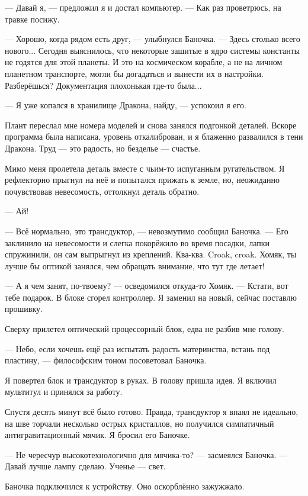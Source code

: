--- Давай я, --- предложил я и достал компьютер.
--- Как раз проветрюсь, на травке посижу.

--- Хорошо, когда рядом есть друг, --- улыбнулся Баночка.
--- Здесь столько всего нового...
Сегодня выяснилось, что некоторые зашитые в ядро системы константы не годятся для этой планеты.
И это на космическом корабле, а не на личном планетном транспорте, могли бы догадаться и вынести их в настройки.
Разберёшься?
Документация плохонькая где-то была...

--- Я уже копался в хранилище Дракона, найду, --- успокоил я его.

Плант переслал мне номера моделей и снова занялся подгонкой деталей.
Вскоре программа была написана, уровень откалиброван, и я блаженно развалился в тени Дракона.
Труд --- это радость, но безделье --- счастье.

Мимо меня пролетела деталь вместе с чьим-то испуганным ругательством.
Я рефлекторно прыгнул на неё и попытался прижать к земле, но, неожиданно почувствовав невесомость, оттолкнул деталь обратно.

--- Ай!

--- Всё нормально, это трансдуктор, --- невозмутимо сообщил Баночка.
--- Его заклинило на невесомости и слегка покорёжило во время посадки, лапки спружинили, он сам выпрыгнул из креплений.
{Ква-ква.}
{Croak, croak.}
Хомяк, ты лучше бы оптикой занялся, чем обращать внимание, что тут где летает!

--- А я чем занят, по-твоему? --- осведомился откуда-то Хомяк.
--- Кстати, вот тебе подарок.
В блоке сгорел контроллер.
Я заменил на новый, сейчас поставлю прошивку.

Сверху прилетел оптический процессорный блок, едва не разбив мне голову.

--- Небо, если хочешь ещё раз испытать радость материнства, встань под пластину, --- философским тоном посоветовал Баночка.

Я повертел блок и трансдуктор в руках.
В голову пришла идея.
Я включил мультитул и принялся за работу.

Спустя десять минут всё было готово.
Правда, трансдуктор я впаял не идеально, на шве торчали несколько острых кристаллов, но получился симпатичный антигравитационный мячик.
Я бросил его Баночке.

--- Не чересчур высокотехнологично для мячика-то? --- засмеялся Баночка.
--- Давай лучше лампу сделаю.
Ученье --- свет.

Баночка подключился к устройству.
Оно оскорблённо зажужжало.

